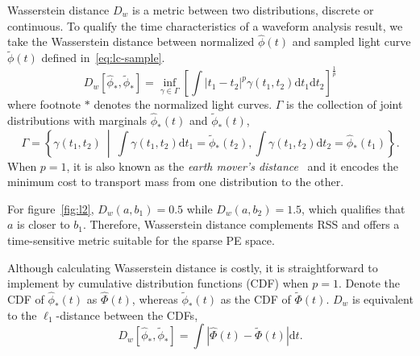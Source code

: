 Wasserstein distance $D_w$ is a metric between two distributions, discrete or continuous. To qualify the time characteristics of a waveform analysis result, we take the Wasserstein distance between normalized $\hat{\phi}(t)$ and sampled light curve $\tilde{\phi}(t)$ defined in~\eqref{eq:lc-sample}.
\begin{equation}
  D_w\left[\hat{\phi}_*, \tilde{\phi}_*\right] = \inf_{\gamma \in \Gamma} \left[\int \left\vert t_1 - t_2 \right\vert^p \gamma(t_1, t_2)\mathrm{d}t_1\mathrm{d}t_2\right]^{\frac{1}{p}}
\end{equation}
where footnote $*$ denotes the normalized light curves. $\Gamma$ is the collection of joint distributions with marginals $\hat{\phi}_*(t)$ and $\tilde{\phi}_*(t)$,
\begin{equation*}
  \label{eq:joint}
  \Gamma = \left\{\gamma(t_1, t_2) ~\middle\vert~ \int\gamma(t_1,t_2)\mathrm{d}t_1 = \tilde{\phi}_*(t_2) , \int\gamma(t_1,t_2)\mathrm{d}t_2 = \hat{\phi}_*(t_1) \right\}.
\end{equation*}
When $p=1$, it is also known as the \textit{earth mover's distance}~\cite{levina_earth_2001} and it encodes the minimum cost to transport mass from one distribution to the other.

For figure~\ref{fig:l2}, $D_w(a, b_1) = 0.5$ while $D_w(a, b_2) = 1.5$, which qualifies that $a$ is closer to $b_1$. Therefore, Wasserstein distance complements RSS and offers a time-sensitive metric suitable for the sparse PE space. 

Although calculating Wasserstein distance is costly, it is straightforward to implement by cumulative distribution functions (CDF) when $p=1$. Denote the CDF of $\hat{\phi}_*(t)$ as $\hat\Phi(t)$, whereas $\tilde{\phi}_*(t)$ as the CDF of $\tilde\Phi(t)$. $D_w$ is equivalent to the $\ell_1$-distance between the CDFs,
\begin{equation}
    D_w\left[\hat{\phi}_*, \tilde{\phi}_*\right] = \int\left|\hat{\Phi}(t) - \tilde{\Phi}(t)\right| \mathrm{d}t.
    \label{eq:numerical}
\end{equation}

